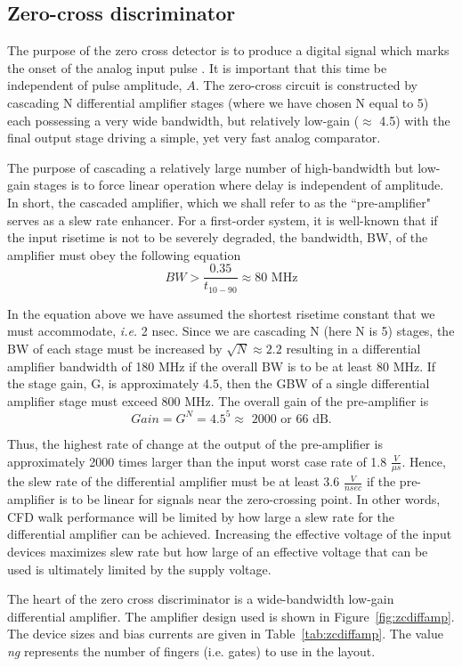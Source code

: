 \documentclass[12pt,oneside,final]{siuethesis}
\theoremstyle{definition}
\begin{document}
\subsection{Zero-cross discriminator}
\par The purpose of the zero cross detector is to produce a digital signal which marks the onset of the analog input pulse \cite{474405}. It is important that this time be independent of pulse amplitude, $A$.  The zero-cross circuit is constructed by cascading N differential amplifier stages (where we have chosen N equal to 5) each possessing a very wide bandwidth, but relatively low-gain ($\approx$ 4.5) with the final output stage driving a simple, yet very fast analog comparator.
\par The purpose of cascading a relatively large number of high-bandwidth but low-gain stages is to force linear operation where delay is independent of amplitude. In short, the cascaded amplifier, which we shall refer to as the ``pre-amplifier" serves as a slew rate enhancer.  For a first-order system, it is well-known that if the input risetime is not to be severely degraded, the bandwidth, BW, of the amplifier must obey the following equation
\begin{equation}
BW > \frac{0.35}{t_{10-90}} \approx \text{80 MHz}
\end{equation}
\par In the equation above we have assumed the shortest risetime constant that we must accommodate, \emph{i.e.}  2 nsec. Since we are cascading N (here N is 5) stages, the BW of each stage must be increased by $\sqrt{N} \approx 2.2$ resulting in a differential amplifier bandwidth of 180 MHz if the overall BW is to be at least 80 MHz.  If the stage gain, G, is approximately 4.5, then the GBW of a single differential amplifier stage must exceed 800 MHz. The overall gain of the pre-amplifier is
\begin{equation}
Gain = G^N = 4.5^5 \approx \text{ 2000 or 66 dB}.
\end{equation}
\par Thus, the highest rate of change at the output of the pre-amplifier is approximately 2000 times larger than the input worst case rate of 1.8 $\frac{V}{\mu s}$.  Hence, the slew rate of the differential amplifier must be at least 3.6 $\frac{V}{nsec}$ if the pre-amplifier is to be linear for signals near the zero-crossing point. In other words, CFD walk performance will be limited by how large a slew rate for the differential amplifier can be achieved. Increasing the effective voltage of the input devices maximizes slew rate but how large of an effective voltage that can be used is ultimately limited by the supply voltage.
\par The heart of the zero cross discriminator is a wide-bandwidth low-gain differential amplifier. The amplifier design used is shown in Figure~\ref{fig:zcdiffamp}. The device sizes and bias currents are given in Table~\ref{tab:zcdiffamp}. The value \emph{ng} represents the number of fingers (i.e. gates) to use in the layout.
\end{document}
